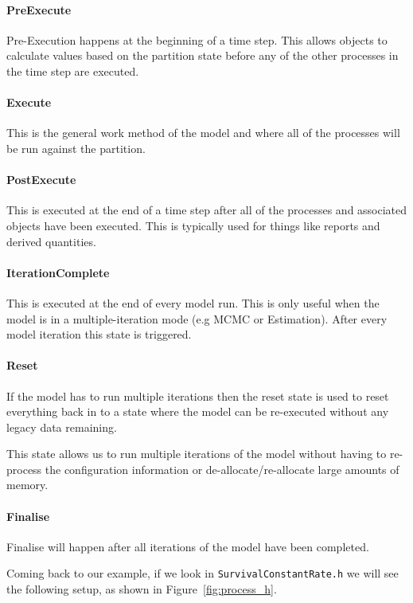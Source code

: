 \paragraph*{PreExecute}
Pre-Execution happens at the beginning of a time step. This allows objects to calculate values based on the partition state before any of the other processes in the time step are executed.

\paragraph*{Execute}
This is the general work method of the model and where all of the processes will be run against the partition.

\paragraph*{PostExecute}
This is executed at the end of a time step after all of the processes and associated objects have been executed. This is typically used for things like reports and derived quantities.

\paragraph*{IterationComplete}
This is executed at the end of every model run. This is only useful when the model is in a multiple-iteration mode (e.g MCMC or Estimation). After every model iteration this state is triggered.

\paragraph*{Reset}
If the model has to run multiple iterations then the reset state is used to reset everything back in to a state where the model can be re-executed without any legacy data remaining.

This state allows us to run multiple iterations of the model without having to re-process the configuration information or de-allocate/re-allocate large amounts of memory.

\paragraph*{Finalise}
Finalise will happen after all iterations of the model have been completed.

Coming back to our example, if we look in \texttt{SurvivalConstantRate.h} we will {\color{red}see} the following setup, as shown in Figure~\ref{fig:process_h}.

